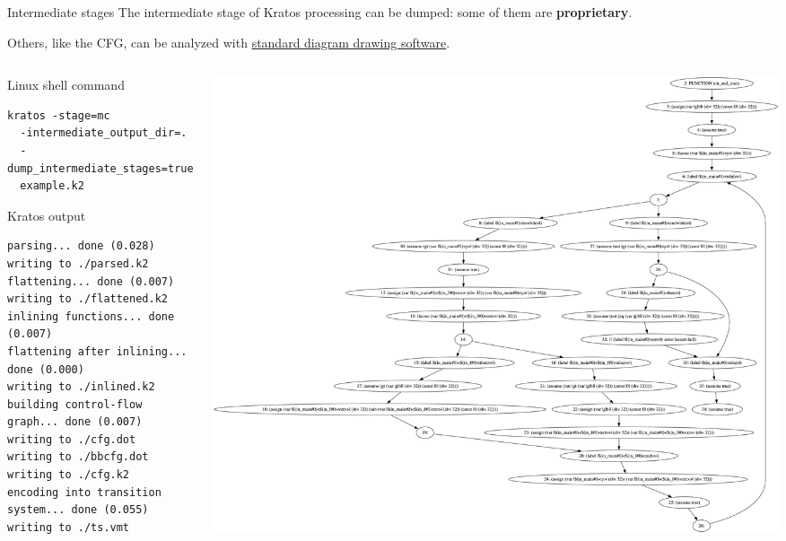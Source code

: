 \documentclass[aspectratio=1610,10.5pt]{beamer} %
\begin{document}
\begin{frame}[fragile]{Intermediate stages}
    The intermediate stage of Kratos processing can be dumped: some of them are \textbf{proprietary}.

    \smallskip

    Others, like the CFG, can be analyzed with \href{https://dreampuf.github.io/GraphvizOnline/}{standard diagram drawing software}.

    \begin{columns}
        \begin{column}{0.35\textwidth}
            \begin{block}{Linux shell command}
                    \begin{verbatim}
kratos -stage=mc
  -intermediate_output_dir=.
  -dump_intermediate_stages=true
  example.k2
                    \end{verbatim}
            \end{block}

            \pause

            \begin{block}{Kratos output}
                    \begin{verbatim}
parsing... done (0.028)
writing to ./parsed.k2
flattening... done (0.007)
writing to ./flattened.k2
inlining functions... done (0.007)
flattening after inlining... done (0.000)
writing to ./inlined.k2
building control-flow graph... done (0.007)
writing to ./cfg.dot
writing to ./bbcfg.dot
writing to ./cfg.k2
encoding into transition system... done (0.055)
writing to ./ts.vmt
                    \end{verbatim}
            \end{block}
        \end{column}

        \pause

        \begin{column}{0.65\textwidth}
            \vspace{0.5cm}
            \includegraphics[height=%
            0.80\textheight]{../res/cfg}
        \end{column}
    \end{columns}
\end{frame}
\end{document}
